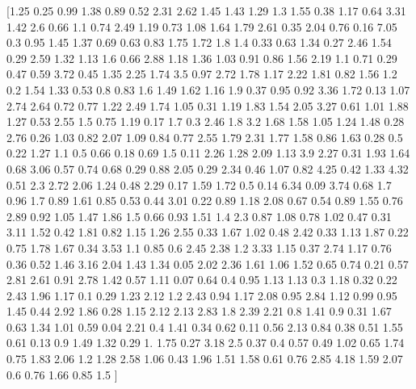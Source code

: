 \documentclass[preview]{standalone}
\begin{document}
\begin{center}
[1.25 0.25 0.99 1.38 0.89 0.52 2.31 2.62 1.45 1.43 1.29 1.3  1.55 0.38
 1.17 0.64 3.31 1.42 2.6  0.66 1.1  0.74 2.49 1.19 0.73 1.08 1.64 1.79
 2.61 0.35 2.04 0.76 0.16 7.05 0.3  0.95 1.45 1.37 0.69 0.63 0.83 1.75
 1.72 1.8  1.4  0.33 0.63 1.34 0.27 2.46 1.54 0.29 2.59 1.32 1.13 1.6
 0.66 2.88 1.18 1.36 1.03 0.91 0.86 1.56 2.19 1.1  0.71 0.29 0.47 0.59
 3.72 0.45 1.35 2.25 1.74 3.5  0.97 2.72 1.78 1.17 2.22 1.81 0.82 1.56
 1.2  0.2  1.54 1.33 0.53 0.8  0.83 1.6  1.49 1.62 1.16 1.9  0.37 0.95
 0.92 3.36 1.72 0.13 1.07 2.74 2.64 0.72 0.77 1.22 2.49 1.74 1.05 0.31
 1.19 1.83 1.54 2.05 3.27 0.61 1.01 1.88 1.27 0.53 2.55 1.5  0.75 1.19
 0.17 1.7  0.3  2.46 1.8  3.2  1.68 1.58 1.05 1.24 1.48 0.28 2.76 0.26
 1.03 0.82 2.07 1.09 0.84 0.77 2.55 1.79 2.31 1.77 1.58 0.86 1.63 0.28
 0.5  0.22 1.27 1.1  0.5  0.66 0.18 0.69 1.5  0.11 2.26 1.28 2.09 1.13
 3.9  2.27 0.31 1.93 1.64 0.68 3.06 0.57 0.74 0.68 0.29 0.88 2.05 0.29
 2.34 0.46 1.07 0.82 4.25 0.42 1.33 4.32 0.51 2.3  2.72 2.06 1.24 0.48
 2.29 0.17 1.59 1.72 0.5  0.14 6.34 0.09 3.74 0.68 1.7  0.96 1.7  0.89
 1.61 0.85 0.53 0.44 3.01 0.22 0.89 1.18 2.08 0.67 0.54 0.89 1.55 0.76
 2.89 0.92 1.05 1.47 1.86 1.5  0.66 0.93 1.51 1.4  2.3  0.87 1.08 0.78
 1.02 0.47 0.31 3.11 1.52 0.42 1.81 0.82 1.15 1.26 2.55 0.33 1.67 1.02
 0.48 2.42 0.33 1.13 1.87 0.22 0.75 1.78 1.67 0.34 3.53 1.1  0.85 0.6
 2.45 2.38 1.2  3.33 1.15 0.37 2.74 1.17 0.76 0.36 0.52 1.46 3.16 2.04
 1.43 1.34 0.05 2.02 2.36 1.61 1.06 1.52 0.65 0.74 0.21 0.57 2.81 2.61
 0.91 2.78 1.42 0.57 1.11 0.07 0.64 0.4  0.95 1.13 1.13 0.3  1.18 0.32
 0.22 2.43 1.96 1.17 0.1  0.29 1.23 2.12 1.2  2.43 0.94 1.17 2.08 0.95
 2.84 1.12 0.99 0.95 1.45 0.44 2.92 1.86 0.28 1.15 2.12 2.13 2.83 1.8
 2.39 2.21 0.8  1.41 0.9  0.31 1.67 0.63 1.34 1.01 0.59 0.04 2.21 0.4
 1.41 0.34 0.62 0.11 0.56 2.13 0.84 0.38 0.51 1.55 0.61 0.13 0.9  1.49
 1.32 0.29 1.   1.75 0.27 3.18 2.5  0.37 0.4  0.57 0.49 1.02 0.65 1.74
 0.75 1.83 2.06 1.2  1.28 2.58 1.06 0.43 1.96 1.51 1.58 0.61 0.76 2.85
 4.18 1.59 2.07 0.6  0.76 1.66 0.85 1.5 ]
\end{center}
\end{document}
